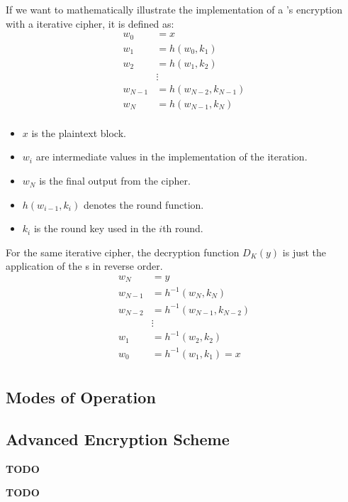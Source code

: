 If we want to mathematically illustrate the implementation of a 's encryption with a iterative cipher, it is defined as:
\begin{align*}
  w_{0} &= x \\
  w_{1} &= h(w_{0}, k_{1}) \\
  w_{2} &= h(w_{1}, k_{2}) \\
        &\vdots \\
  w_{N-1} &= h(w_{N-2}, k_{N-1}) \\
  w_{N} &= h(w_{N-1}, k_{N}) \\
\end{align*}
\begin{itemize}[noitemsep]
\item $x$ is the plaintext block.
\item $w_{i}$ are intermediate values in the implementation of the iteration.
\item $w_{N}$ is the final output from the cipher.
\item $h(w_{i-1}, k_{i})$ denotes the round function.
\item $k_{i}$ is the round key used in the $i$th round.
\end{itemize}

For the same iterative cipher, the decryption function $D_{K}(y)$ is just the application of the s in reverse order.
\begin{align*}
  w_{N} &= y \\
  w_{N-1} &= h^{-1}(w_{N}, k_{N}) \\
  w_{N-2} &= h^{-1}(w_{N-1}, k_{N-2}) \\
        &\vdots \\
  w_{1} &= h^{-1}(w_{2}, k_{2}) \\
  w_{0} &= h^{-1}(w_{1}, k_{1}) = x \\
\end{align*}

\subsection{Modes of Operation}\label{subsec:Modes_of_Operation}
\begin{definition}\label{def:Mode_of_Operation}
  
\end{definition}

\subsection{Advanced Encryption Scheme}\label{subsec:AES}
\textbf{TODO}
\begin{definition}\label{def:AES}
  \textbf{TODO}
\end{definition}

